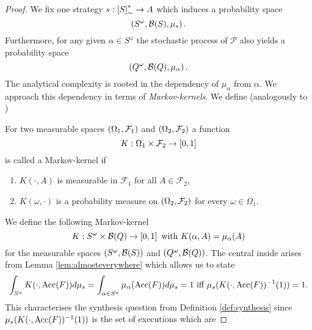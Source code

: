 \begin{proof}
  We fix one strategy $s:\left[S\right]_{\sim}^{*}\rightarrow A$ which induces a 
  probability space
  \begin{equation*}
    \left(S^{\omega},\mathcal{B}(S), \mu_{s}\right).
  \end{equation*}
  Furthermore, for any given $\alpha\in S^{\omega}$ the stochastic process of
  $\mathcal{P}$ also yields a probability space
  \begin{equation*}
    \left(Q^{\omega},\mathcal{B}(Q), \mu_{\alpha}\right).
  \end{equation*}
  The analytical complexity is rooted in the dependency of $\mu_{\alpha}$ from
  $\alpha$. We approach this dependency in terms of \emph{Markov-kernels}. We
  define (analogously to \cite[Definition 8.25]{Klenke})
  \begin{definition}
    For two measurable spaces $\left(\Omega_{1},\mathcal{F}_{1}\right)$ and 
    $\left(\Omega_{2},\mathcal{F}_{2}\right)$ a function
    \begin{equation*}
      K:\Omega_{1}\times\mathcal{F}_{2}\rightarrow\left[0,1\right]
    \end{equation*}
    is called a Markov-kernel if
    \begin{enumerate}
      \item $K(\cdot, A)$ is measurable in $\mathcal{F_{1}}$ for all 
        $A\in\mathcal{F}_{2}$,
      \item $K(\omega, \cdot)$ is a probability measure on 
        $\left(\Omega_{2},\mathcal{F}_{2}\right)$ for every $\omega\in\Omega_{1}$.
    \end{enumerate}
  \end{definition}
  We define the following Markov-kernel
  \begin{equation*}
    K:S^{\omega}\times\mathcal{B}(Q)\rightarrow\left[0,1\right]\text{ with }
      K(\alpha, A) = \mu_{\alpha}(A)
  \end{equation*}
  for the measurable spaces $\left(S^{\omega},\mathcal{B}(S)\right)$ and 
  $\left(Q^{\omega},\mathcal{B}(Q)\right)$. The central inside arises from Lemma 
  \ref{lem:almosteverywhere} which allows us to state
  \begin{equation*}
    \int_{S^{\omega}}K(\cdot, \operatorname{Acc}(F)) d\mu_{s} 
    = \int_{\alpha\in S^{\omega}}\mu_{\alpha}(\operatorname{Acc}(F))d\mu_{s} = 1 \text{ iff }
      \mu_{s}(K(\cdot,\operatorname{Acc}(F))^{-1}(1)) = 1.
  \end{equation*}
  This characterises the synthesis question from Definition \ref{def:synthesis}
  since $\mu_{s}(K(\cdot,\operatorname{Acc}(F))^{-1}(1))$ is the set of executions which are

\end{proof}
